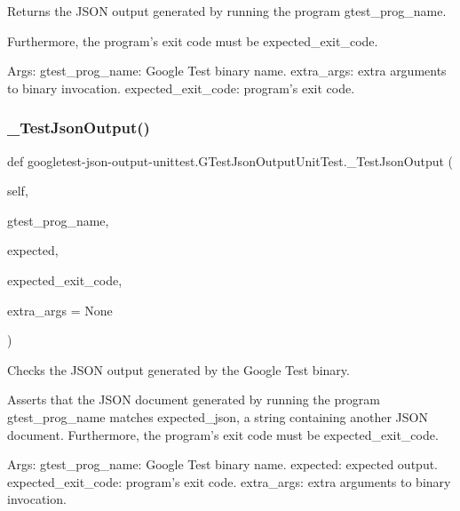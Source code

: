 \begin{DoxyVerb}Returns the JSON output generated by running the program gtest_prog_name.

Furthermore, the program's exit code must be expected_exit_code.

Args:
  gtest_prog_name: Google Test binary name.
  extra_args: extra arguments to binary invocation.
  expected_exit_code: program's exit code.
\end{DoxyVerb}
 \mbox{\label{classgoogletest-json-output-unittest_1_1_g_test_json_output_unit_test_a0145de3211dd5d9e50aa23c8ae9fde5e}} 
\subsubsection{\texorpdfstring{\_TestJsonOutput()}{\_TestJsonOutput()}}
{\footnotesize\ttfamily def googletest-\/json-\/output-\/unittest.\+G\+Test\+Json\+Output\+Unit\+Test.\+\_\+\+Test\+Json\+Output (\begin{DoxyParamCaption}\item[{}]{self,  }\item[{}]{gtest\+\_\+prog\+\_\+name,  }\item[{}]{expected,  }\item[{}]{expected\+\_\+exit\+\_\+code,  }\item[{}]{extra\+\_\+args = {\ttfamily None} }\end{DoxyParamCaption})\hspace{0.3cm}{\ttfamily [private]}}

\begin{DoxyVerb}Checks the JSON output generated by the Google Test binary.

Asserts that the JSON document generated by running the program
gtest_prog_name matches expected_json, a string containing another
JSON document.  Furthermore, the program's exit code must be
expected_exit_code.

Args:
  gtest_prog_name: Google Test binary name.
  expected: expected output.
  expected_exit_code: program's exit code.
  extra_args: extra arguments to binary invocation.
\end{DoxyVerb}
 \mbox{\label{classgoogletest-json-output-unittest_1_1_g_test_json_output_unit_test_a6003d1c583fc2ded1ab5276fc82cb1c9}} 
